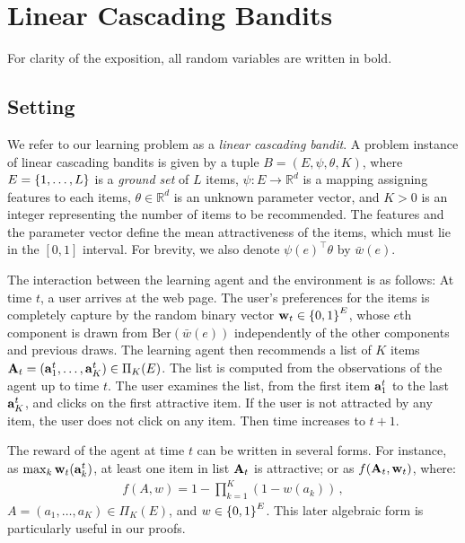 
\section{Linear Cascading Bandits}
\label{sec:cascading bandits}

For clarity of the exposition, all random variables are written in bold.


\subsection{Setting}
\label{sec:setting}

We refer to our learning problem as a \emph{linear cascading bandit}.
A problem instance of linear cascading bandits is given
by a tuple $B = (E, \psi, \theta, K)$,
where $E = \left\{1, \dots, L\right\}$ is a \emph{ground set} of $L$ items,
$\psi : E \rightarrow \mathbb{R}^d$ is a mapping assigning features to each items,
$\theta \in \mathbb{R}^d$ is an unknown parameter vector,
and $K > 0$ is an integer representing the number of items to be recommended.
The features and the parameter vector define the mean attractiveness of the items, which must lie in the $[0,1]$ interval.
For brevity, we also denote $\psi(e)^\top\theta$ by $\bar{w}(e)$.

The interaction between the learning agent and the environment is as follows:
At time $t$, a user arrives at the web page. The user's preferences for the
items is completely capture by the random binary vector $\mathbf{w}_t\in \left\{0,1\right\}^E$, whose $e$th component is drawn from $\mathrm{Ber}( \bar{w}(e))$ independently of the other components and previous draws.
The learning agent then recommends a list of $K$ items
$\mathbf{A}_t = (\mathbf{a}^t_1, \dots, \mathbf{a}^t_K) \in \Pi_K(E)$.
The list is computed from the observations of the agent up to time $t$.
The user examines the list,
  from the first item $\mathbf{a}^t_1$ to the last $\mathbf{a}^t_K$,
  and clicks on the first attractive item.
If the user is not attracted by any item,
  the user does not click on any item. Then time increases to $t + 1$.

The reward of the agent at time $t$ can be written in several forms.
For instance, as $\max_k \mathbf{w}_t(\mathbf{a}^t_k)$, at least one item in list $\mathbf{A}_t$ is attractive; or as $f(\mathbf{A}_t, \mathbf{w}_t)$, where:
\begin{align*}
  f(A, w) = 1 - \prod_{k = 1}^K (1 - w(a_k))\,,
\end{align*}
$A = (a_1, \dots, a_K) \in \Pi_K(E)$, and $w \in \left\{0, 1\right\}^E$. This later algebraic form is particularly useful in our proofs.

